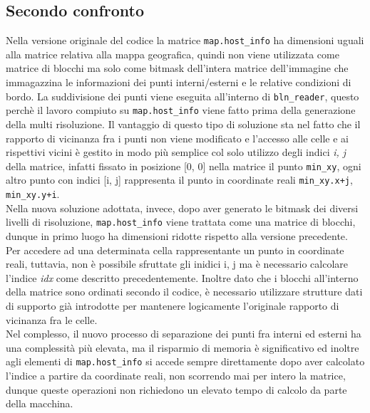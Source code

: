 		\subsection{Secondo confronto}
			Nella versione originale del codice la matrice \texttt{map.host\_info} ha dimensioni uguali alla matrice relativa alla mappa geografica, quindi non viene utilizzata come matrice di blocchi ma solo come bitmask dell'intera matrice dell'immagine che immagazzina le informazioni dei punti interni/esterni e le relative condizioni di bordo. La suddivisione dei punti viene eseguita all'interno di \texttt{bln\_reader}, questo perch\`{e} il lavoro compiuto su \texttt{map.host\_info} viene fatto prima della generazione della multi risoluzione. Il vantaggio di questo tipo di soluzione sta nel fatto che il rapporto di vicinanza fra i punti non viene modificato e l'accesso alle celle e ai rispettivi vicini \`{e} gestito in modo pi\`{u} semplice col solo utilizzo degli indici \textit{i, j} della matrice, infatti fissato in posizione [0, 0] nella matrice il punto \texttt{min\_xy}, ogni altro punto con indici [i, j] rappresenta il punto in coordinate reali \texttt{min\_xy.x+j}, \texttt{min\_xy.y+i}.\\
			Nella nuova soluzione adottata, invece, dopo aver generato le bitmask dei diversi livelli di risoluzione, \texttt{map.host\_info} viene trattata come una matrice di blocchi, dunque in primo luogo ha dimensioni ridotte rispetto alla versione precedente. Per accedere ad una determinata cella rappresentante un punto in coordinate reali, tuttavia, non \`{e} possibile sfruttate gli inidici i, j ma \`{e} necessario calcolare l'indice \textit{idx} come descritto precedentemente. Inoltre dato che i blocchi all'interno della matrice sono ordinati secondo il codice, \`{e} necessario utilizzare strutture dati di supporto gi\`{a} introdotte per mantenere logicamente l'originale rapporto di vicinanza fra le celle.\\
			Nel complesso, il nuovo processo di separazione dei punti fra interni ed esterni ha una complessit\`{a} pi\`{u} elevata, ma il risparmio di memoria \`{e} significativo ed inoltre agli elementi di \texttt{map.host\_info} si accede sempre direttamente dopo aver calcolato l'indice a partire da coordinate reali, non scorrendo mai per intero la matrice, dunque queste operazioni non richiedono un elevato tempo di calcolo da parte della macchina.\\

